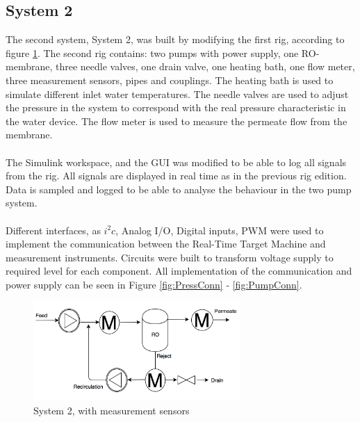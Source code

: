 \subsection{System 2}
The second system, System 2, was built by modifying the first rig, according to figure \ref{fig:MeasSys2}. The second rig contains: two pumps with power supply, one RO-membrane, three needle valves, one drain valve, one heating bath, one flow meter, three measurement sensors, pipes and couplings. The heating bath is used to simulate different inlet water temperatures. The needle valves are used to adjust the pressure in the system to correspond with the real pressure characteristic in the water device. The flow meter is used to measure the permeate flow from the membrane. \\
\\
The Simulink workspace, and the GUI was modified to be able to log all signals from the rig. All signals are displayed in real time as in the previous rig edition. Data is sampled and logged to be able to analyse the behaviour in the two pump system.  \\
\\
Different interfaces, as $i^{2}c$, Analog I/O, Digital inputs, PWM were used to implement the communication between the Real-Time Target Machine and measurement instruments. Circuits were built to transform voltage supply to required level for each component. All implementation of the communication and power supply can be seen in Figure \ref{fig:PressConn} - \ref{fig:PumpConn}. 

\begin{figure}[H]
    \centering
    \includegraphics[width=0.7\textwidth]{MeasSys2}
    \caption{System 2, with measurement sensors}
    \label{fig:MeasSys2}
\end{figure}

